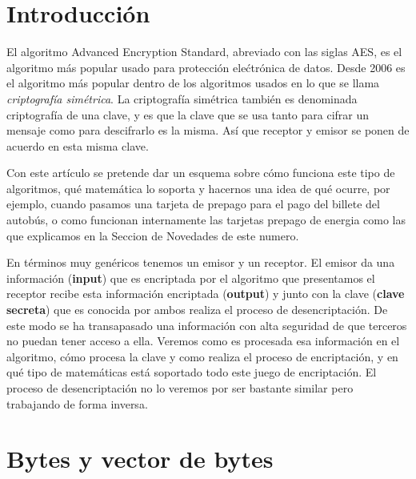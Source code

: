 \section*{Introducción}
El algoritmo Advanced Encryption Standard, abreviado con las siglas AES, es el algoritmo más popular usado para protección elećtrónica de datos. Desde 2006 es el algoritmo más popular dentro de los algoritmos usados en lo que se llama \emph{criptografía simétrica}. La criptografía simétrica también es denominada criptografía de una clave, y es que la clave que se usa tanto para cifrar un mensaje como para descifrarlo es la misma. Así que receptor y emisor se ponen de acuerdo en esta misma clave.

Con este artículo se pretende dar un esquema sobre cómo funciona este tipo de algoritmos, qué matemática lo soporta y hacernos una idea de qué ocurre, por ejemplo,  cuando pasamos una tarjeta de prepago para el pago del billete del autobús, o como funcionan internamente las tarjetas prepago de energia como las que explicamos en la Seccion de Novedades de este numero.

En términos muy genéricos tenemos un emisor y un receptor. El emisor da una información (\textbf{input}) que es encriptada por el algoritmo que presentamos el receptor recibe esta información encriptada (\textbf{output}) y junto con la clave (\textbf{clave secreta}) que es conocida por ambos realiza el proceso de desencriptación. De este modo se ha transapasado una información con alta seguridad de que terceros no puedan tener acceso a ella. Veremos como es procesada esa información  en  el algoritmo, cómo procesa la clave y como realiza el proceso de encriptación, y en qué tipo de matemáticas está soportado todo este juego de encriptación. El proceso de desencriptación no lo veremos por ser bastante similar pero trabajando de forma inversa.

\section{Bytes y vector de bytes}

